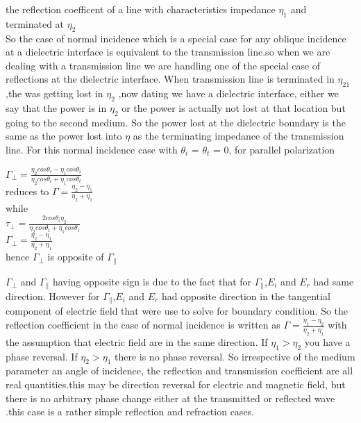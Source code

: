 the reflection coefficent of a line with characteristics impedance  $\eta_{1}$ and terminated at  $\eta_{2}$\\
So the case of normal incidence which is a special case for any oblique incidence at a dielectric interface is equivalent to the transmission line.so when we are dealing with a transmission  line we are handling one of the special case of reflections at the dielectric interface. When  transmission  line is terminated in  $\eta_{21}$,the was getting lost in  $\eta_{2}$ ,now dating we have a dielectric interface,  either we say that the power is in  $\eta_{2}$ or the power is actually not lost at that location but going to the second medium. So the power lost at the dielectric  boundary is the same as the power lost into  $\eta$ as the terminating impedance  of the transmission  line. 
For this normal incidence case with $\theta_{i}$ = $\theta_{t}$ = 0, for parallel polarization
\begin{center}
$\Gamma_{\perp} = \frac{\eta_{2} cos\theta_{i} - \eta_{1} cos\theta_{i}}{\eta_{2} cos\theta_{i} + \eta_{1} cos\theta_{t}}$\newline
\\reduces to
$\Gamma = \frac{\eta_{2} - \eta_{1}}{\eta_{2} + \eta_{1}}$\newline
\\
while\\
$\tau_{\perp} = \frac{2 cos\theta_{i} \eta_{2}}{\eta_{2} cos\theta_{t} + \eta_{1} cos\theta_{i}}$\newline 
\\
$\Gamma_{\perp} = \frac{\eta_{2} -\eta_{1}}{\eta_{2} +\eta_{1}}$\\
hence $\Gamma_{\perp}$ is opposite of $\Gamma_{\parallel}$

\end{center}
$\Gamma_{\perp}$ and $\Gamma_{\parallel}$ having opposite sign is due to the fact that for  $\Gamma_{\parallel}$,$E_{i}$ and $E_{r}$ had same direction. However for  $\Gamma_{\parallel}$,$E_{i}$ and $E_{r}$ had opposite  direction in the tangential component of electric  field that were use to solve for boundary  condition. So the reflection coefficient  in the case of normal incidence is written as $\Gamma = \frac{\eta_{1} - \eta_{2}}{\eta_{2} + \eta_{1}}$  with the assumption that electric field are in the same direction. If $\eta_{1}>\eta_{2}$ you have a phase reversal. If $\eta_{2}>\eta_{1}$ there is no phase reversal. 
So irrespective  of the medium parameter  an angle of incidence, the reflection and transmission  coefficient  are all real quantities.this may be direction reversal for electric and magnetic field,  but there is no arbitrary  phase change either at the transmitted or reflected  wave  .this case is a rather simple reflection and refraction cases. 